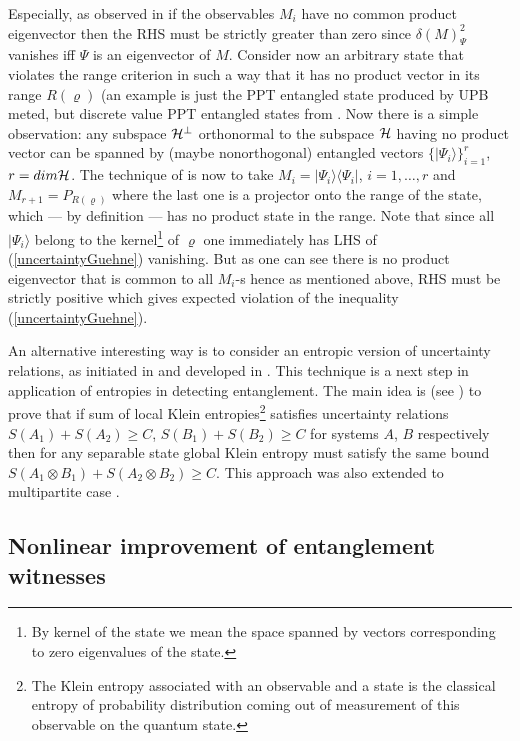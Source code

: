 \documentclass[twocolumn,aps,rmp]{revtex4}
\begin{document}
Especially, as observed in \cite{OGuehne} if the observables $M_{i}$
have no common product eigenvector then the RHS must be strictly
greater than zero since $\delta(M)^{2}_{\Psi}$ vanishes iff $\Psi$
is an eigenvector of $M$. Consider now an arbitrary state that
violates the range criterion in such a way that it has no product
vector in its range $R(\varrho)$ (an example is just the PPT
entangled state produced by UPB meted, but discrete value PPT
entangled states from \cite{boundCV}. Now there is a simple
observation: any subspace ${\cal H}^{\perp}$ orthonormal to the
subspace ${\cal H}$ having no product vector can be spanned by
(maybe nonorthogonal) entangled vectors $\{ |\Psi_{i}\rangle
\}_{i=1}^{r}$, $r=dim{\cal H}$. The technique of \cite{OGuehne} is
now to take $M_{i}=|\Psi_i\rangle \langle \Psi_i|$, $i=1,\ldots,r$ and
$M_{r+1}=P_{R(\varrho)}$ where the last one is a projector onto the
range of the state, which --- by definition --- has no product state in
the range. Note that since all $|\Psi_i \rangle$ belong to the
kernel\footnote{By kernel of the state we mean the space spanned by
vectors corresponding to zero eigenvalues of the state.} of
$\varrho$  one immediately has LHS of (\ref{uncertaintyGuehne})
vanishing. But as one can see there is no product eigenvector that
is common to all $M_{i}$-s hence as mentioned above, RHS must be
strictly positive which gives expected violation of the inequality
(\ref{uncertaintyGuehne}).

An alternative interesting way is to consider an entropic version of
uncertainty relations, as initiated in \cite{Giovannetti2} and
developed in \cite{GuehneL2004-pra}. This technique is a next step in
application of entropies in detecting entanglement. The main idea is
(see \cite{GuehneL2004-pra}) to prove that if sum of local Klein
entropies\footnote{The Klein entropy associated with an observable and
  a state is the classical entropy of probability distribution coming
  out of measurement of this observable on the quantum state.}
satisfies uncertainty relations $S(A_{1}) + S(A_{2})\geq C$, $S(B_{1})
+ S(B_{2})\geq C$ for systems $A$, $B$ respectively then for any
separable state global Klein entropy must satisfy the same bound
$S(A_{1} \otimes B_{1}) + S(A_{2} \otimes B_{2})\geq C$. This approach
was also extended to multipartite case \cite{GuehneL2004-pra}.



\subsection{Nonlinear improvement of entanglement witnesses}
\label{subsec:NonlinearImprovement}
\end{document}

